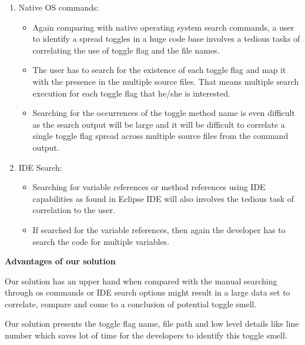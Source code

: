 \documentclass[conference]{IEEEtran}
\begin{document}
\begin{enumerate}
\item{Native OS commands:

\begin{itemize}
\item Again comparing with native operating system search commands, a user to identify a spread toggles in a huge code base involves a tedious tasks of correlating the use of toggle flag and the file names.
\item The user has to search for the existence of each toggle flag and map it with the presence in the multiple source files. That means multiple search execution for each toggle flag that he/she is interested.
\item Searching for the occurrences of the toggle method name is even difficult as the search output will be large and it will be difficult to correlate a single toggle flag spread across multiple source files from the command output.
\end{itemize}
}

\item{IDE Search:
\begin{itemize}
\item Searching for variable references or method references using IDE capabilities as found in Eclipse IDE will also involves the tedious task of correlation to the user.
\item If searched for the variable references, then again the developer has to search the code for multiple variables.
\end{itemize}
}
\end{enumerate}

\textbf{Advantages of our solution}

Our solution has an upper hand when compared with the manual searching through os commands or IDE search options might result in a large data set to correlate, compare and come to a conclusion of potential toggle smell.

Our solution presents the toggle flag name, file path and low level details like line number which saves lot of time for the developers to identify this toggle smell.
\end{document}
